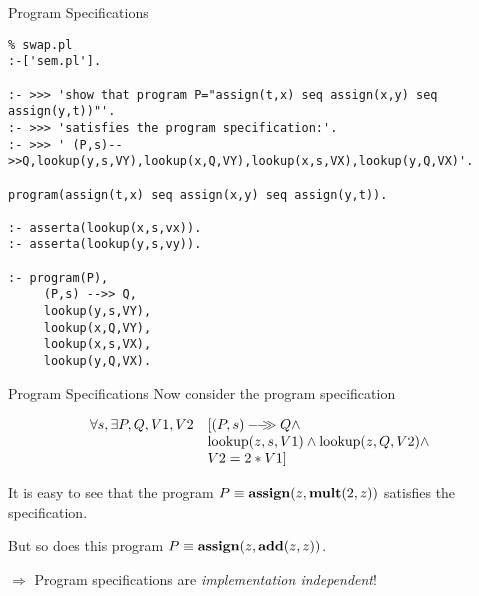 \documentclass{beamer}
\begin{document}
\begin{frame}[fragile]{Program Specifications}

{\tiny
\begin{verbatim}
% swap.pl
:-['sem.pl'].

:- >>> 'show that program P="assign(t,x) seq assign(x,y) seq assign(y,t))"'.
:- >>> 'satisfies the program specification:'.
:- >>> ' (P,s)-->>Q,lookup(y,s,VY),lookup(x,Q,VY),lookup(x,s,VX),lookup(y,Q,VX)'.

program(assign(t,x) seq assign(x,y) seq assign(y,t)).                                              
                                                                                                   
:- asserta(lookup(x,s,vx)).
:- asserta(lookup(y,s,vy)).                                                                        
                                                                                                   
:- program(P),
     (P,s) -->> Q,
     lookup(y,s,VY),
     lookup(x,Q,VY),
     lookup(x,s,VX),                                                                               
     lookup(y,Q,VX).
\end{verbatim}
}
\end{frame}




\begin{frame}[fragile]{Program Specifications}
Now consider the program specification
{\scriptsize
\[
\begin{array}{rl}
\forall s,\exists P,Q,V1,V2& [{(P,s)}-\!\!-\!\!\!\!\gg{Q} \wedge \\
   		& {\rm lookup}(z,s,V1) \wedge {\rm lookup}(z,Q,V2) \wedge\\
		& V2 =  2 * V1 ]
\end{array}
\]

}
It is easy to see that the program $P \equiv {\bf assign}(z,{\bf mult}(2,z))$ satisfies the specification.

\vspace{.1in}

But so does this program $P \equiv {\bf assign}(z,{\bf add}(z,z))$.

\vspace{.3in}

$\Rightarrow$ Program specifications are {\em implementation independent}!
\end{frame}
\end{document}
